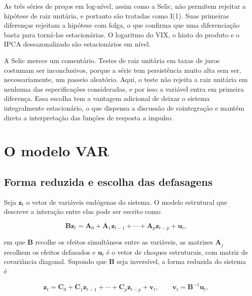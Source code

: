 \documentclass[12pt,openright,oneside,a4paper,portuguese,brazil]{abntex2}
\begin{document}
As três séries de preços em log-nível, assim como a Selic, não permitem
rejeitar a hipótese de raiz unitária, e portanto são
tratadas como I(1). Suas primeiras diferenças rejeitam a hipótese com folga, o
que confirma que uma diferenciação basta para torná-las estacionárias. O
logaritmo do VIX, o hiato do produto e o IPCA dessazonalizado são estacionários
em nível.

A Selic merece um comentário. Testes de raiz unitária em taxas de juros
costumam ser inconclusivos, porque a série tem persistência muito alta sem ser,
necessariamente, um passeio aleatório. Aqui, o teste não rejeita a raiz
unitária em nenhuma das especificações consideradas, e por isso a variável
entra em primeira diferença. Essa escolha tem a vantagem adicional de deixar o
sistema integralmente estacionário, o que dispensa a discussão de cointegração
e mantém direta a interpretação das funções de resposta a impulso.

\section{O modelo VAR}
\label{sec:var}

\subsection{Forma reduzida e escolha das defasagens}

Seja $\mathbf{z}_t$ o vetor de variáveis endógenas do sistema. O modelo
estrutural que descreve a interação entre elas pode ser escrito como

\begin{equation}
\mathbf{B}\mathbf{z}_t = \mathbf{A}_0 + \mathbf{A}_1\mathbf{z}_{t-1}
+ \cdots + \mathbf{A}_p\mathbf{z}_{t-p} + \mathbf{u}_t,
\label{eq:estrutural}
\end{equation}

\noindent em que $\mathbf{B}$ recolhe os efeitos simultâneos entre as
variáveis, as matrizes $\mathbf{A}_j$ recolhem os efeitos defasados e
$\mathbf{u}_t$ é o vetor de choques estruturais, com matriz de covariância
diagonal. Supondo que $\mathbf{B}$ seja inversível, a forma reduzida do sistema
é

\begin{equation}
\mathbf{z}_t = \mathbf{C}_0 + \mathbf{C}_1\mathbf{z}_{t-1}
+ \cdots + \mathbf{C}_p\mathbf{z}_{t-p} + \mathbf{v}_t,
\qquad \mathbf{v}_t = \mathbf{B}^{-1}\mathbf{u}_t,
\label{eq:reduzida}
\end{equation}
\end{document}
